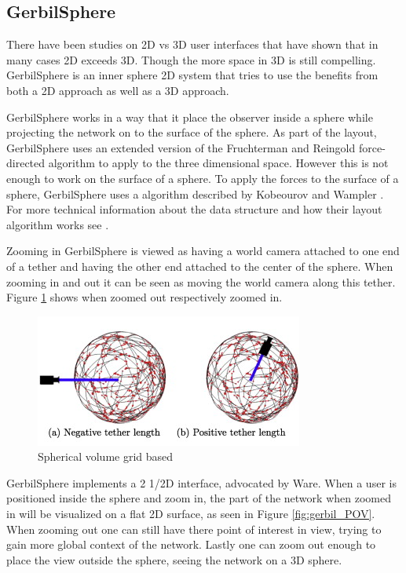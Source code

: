 \documentclass[a4paper,11pt]{kth-mag}
\begin{document}
\subsection{GerbilSphere}
\label{Gerbil:chap2}
There have been studies on 2D vs 3D user interfaces that have shown that in many cases 2D exceeds 3D. Though the more space in 3D is still compelling. GerbilSphere is an inner sphere 2D system that tries to 
use the benefits from both a 2D approach as well as a 3D approach.

GerbilSphere works in a way that it place the observer inside a sphere while projecting the network on to the surface of the sphere. As part of the layout, GerbilSphere uses an extended version of the
 Fruchterman and Reingold force-directed algorithm to apply to the three dimensional space. However this is not enough to work on the surface of a sphere. To apply the forces to the surface of a sphere, GerbilSphere uses a 
 algorithm described by Kobeourov and Wampler \cite{kobourov}. For more technical information about the data structure and how their layout algorithm works see \cite{Shelley20121016}.

Zooming in GerbilSphere is viewed as having a world camera attached to one end of a tether and having the other end attached to the center of the sphere. When zooming in and out it can be seen as moving the world camera along this 
tether. Figure \ref{fig:gerbil_zoom} shows when zoomed out respectively zoomed in.
\begin{figure}[!htbp]
	\centering
	\includegraphics{GerbilZoomTether}
	\caption{Spherical volume grid based}
	\label{fig:gerbil_zoom}
\end{figure}

GerbilSphere implements a 2 1/2D interface, advocated by Ware\cite{Ware}. When a user is positioned inside the sphere and zoom in, the part of the network when zoomed in will be visualized on a flat 2D surface, as seen in Figure
\ref{fig:gerbil_POV}. When zooming out one can still have there point of interest in view, trying to gain more global context of the network. Lastly one can zoom
 out enough to place the view outside the sphere, seeing the network on a 3D sphere.
 
\end{document}
